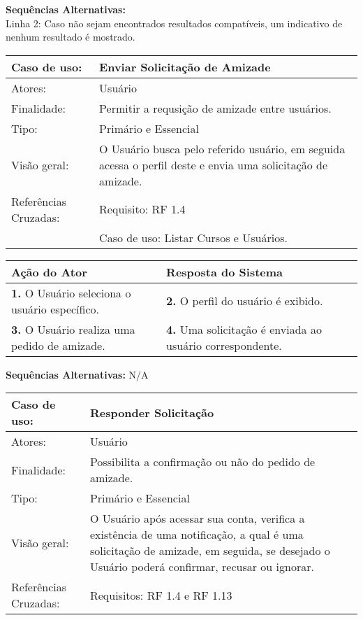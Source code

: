 \documentclass[12pt,a4paper,onecolumn,titlepage]{article}
\begin{document}
\textbf{Sequências Alternativas:}\\
Linha 2: Caso não sejam encontrados resultados compatíveis, um indicativo de nenhum resultado é mostrado.
\newpage


\begin{table}[h!]
\begin{center}
\begin{tabular}{p{2.5cm} p{9.5cm}}
Caso de uso: & \textbf{Enviar Solicitação de Amizade} \\ \hline
Atores: & Usuário \\ \hline
Finalidade: & Permitir a requsição de amizade entre usuários. \\ \hline
Tipo: & Primário e Essencial \\ \hline
Visão geral: & O Usuário busca pelo referido usuário, em seguida acessa o perfil deste e envia uma solicitação de amizade. \\ \hline
Referências Cruzadas: & Requisito: RF 1.4 \\ & Caso de uso: Listar Cursos e Usuários.
\end{tabular}
\end{center}
\end{table}


\begin{center}
\def\arraystretch{1.1}
\begin{tabular}{|p{6cm}|p{6cm}|}

\hline
\textbf{Ação do Ator} & \textbf{Resposta do Sistema} \\ \hline
\textbf{1.} O Usuário seleciona o usuário específico. & \textbf{2.} O perfil do usuário é exibido. \\ \hline
\textbf{3.} O Usuário realiza uma pedido de amizade. & \textbf{4.} Uma solicitação é enviada ao usuário correspondente. \\ \hline
\end{tabular}
\end{center}


\textbf{Sequências Alternativas:} N/A
\newpage


\begin{table}[h!]
\begin{center}
\begin{tabular}{p{2.5cm} p{9.5cm}}
Caso de uso: & \textbf{Responder Solicitação} \\ \hline
Atores: & Usuário \\ \hline
Finalidade: & Possibilita a confirmação ou não do pedido de amizade. \\ \hline
Tipo: & Primário e Essencial\\ \hline
Visão geral: & O Usuário após acessar sua conta, verifica a existência de uma notificação, a qual é uma solicitação de amizade, em seguida, se desejado o Usuário poderá confirmar, recusar ou ignorar.\\ \hline
Referências Cruzadas: & Requisitos: RF 1.4 e RF 1.13 
\end{tabular}
\end{center}
\end{table}
\end{document}

